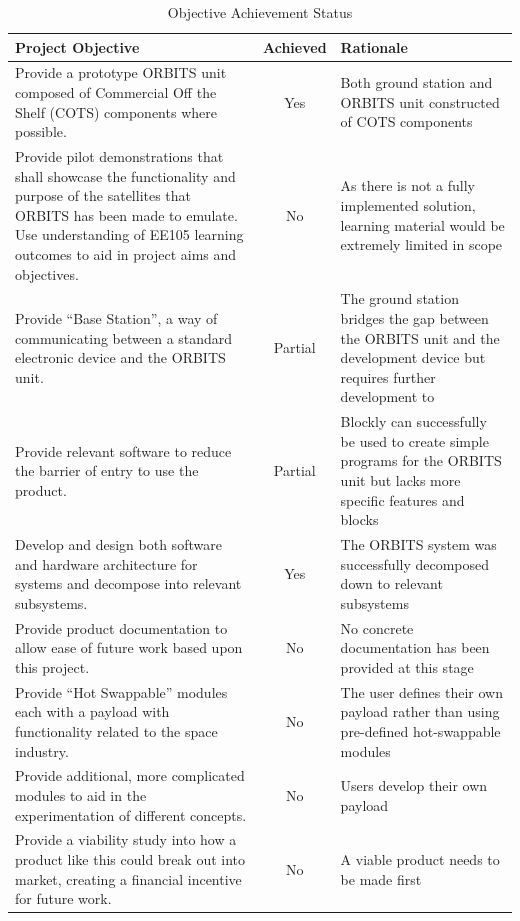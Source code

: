 \documentclass[a4paper,12pt,titlepage]{report}
\begin{document}
\begin{table}[h]
\centering
\caption{Objective Achievement Status}
\label{tab:objective_achievement}
\begin{tabular}{|p{9cm}|c|p{5cm}|}
\hline
\textbf{Project Objective} & \textbf{Achieved}& \textbf{Rationale} \\ \hline
Provide a prototype ORBITS unit composed of Commercial Off the Shelf (COTS) components where possible. & Yes & Both ground station and ORBITS unit constructed of COTS components\\ \hline
Provide pilot demonstrations that shall showcase the functionality and purpose of the satellites that ORBITS has been made to emulate. Use understanding of EE105 learning outcomes to aid in project aims and objectives. & No & As there is not a fully implemented solution, learning material would be extremely limited in scope \\ \hline
Provide ``Base Station'', a way of communicating between a standard electronic device and the ORBITS unit. & Partial & The ground station bridges the gap between the ORBITS unit and the development device but requires further development to \\ \hline
Provide relevant software to reduce the barrier of entry to use the product. & Partial & Blockly can successfully be used to create simple programs for the ORBITS unit but lacks more specific features and blocks \\ \hline
Develop and design both software and hardware architecture for systems and decompose into relevant subsystems. & Yes & The ORBITS system was successfully decomposed down to relevant subsystems\\ \hline
Provide product documentation to allow ease of future work based upon this project. & No & No concrete documentation has been provided at this stage \\ \hline
Provide ``Hot Swappable'' modules each with a payload with functionality related to the space industry. & No & The user defines their own payload rather than using pre-defined hot-swappable modules\\ \hline
Provide additional, more complicated modules to aid in the experimentation of different concepts. & No & Users develop their own payload\\ \hline
Provide a viability study into how a product like this could break out into market, creating a financial incentive for future work. & No & A viable product needs to be made first\\ \hline
\end{tabular}
\end{table}
\end{document}
